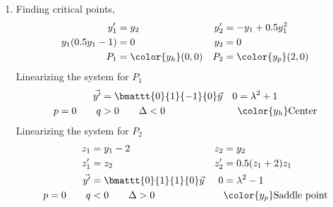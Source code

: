 \begin{enumerate}
    \item Finding critical points,
          \begin{align}
              y_1'            & = y_2                & y_2' & = -y_1 + 0.5y_1^{2} \\
              y_1(0.5y_1 - 1) & = 0                  & y_2  & = 0                 \\
              P_1             & = \color{y_h}(0, 0)  &
              P_2             & = \color{y_p} (2, 0)
          \end{align}
          Linearizing the system for $ P_1 $
          \begin{align}
              \vec{y'}       & = \bmattt{0}{1}{-1}{0} \vec{y} &
              0              & = \lambda^{2} + 1                \\
              p = 0 \qquad q & > 0 \qquad \Delta < 0          &
                             & \color{y_h} \text{Center}
          \end{align}
          Linearizing the system for $ P_2 $
          \begin{align}
              z_1            & = y_1 - 2                       &
              z_2            & = y_2                             \\
              z_1'           & = z_2                           &
              z_2'           & = 0.5(z_1 + 2)z_1                 \\
              \vec{y'}       & = \bmattt{0}{1}{1}{0} \vec{y}   &
              0              & = \lambda^{2} - 1                 \\
              p = 0 \qquad q & < 0 \qquad \Delta > 0           &
                             & \color{y_p} \text{Saddle point}
          \end{align}


\end{enumerate}
